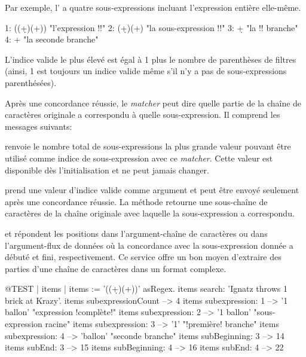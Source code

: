 \documentclass[a4paper,10pt,twoside]{book}
\begin{document}
{
Par exemple, l'\expreg \ct{((\d+)\s*(\w+))} a quatre sous-expressions
incluant l'expression entière elle-même.
\begin{code}{}
1:    ((\d+)\s*(\w+))    "l'expression !!"
2:    (\d+)\s*(\w+)       "la sous-expression !!"
3:    \d+                      "la !! branche"
4:    \w+                     "la seconde branche"
\end{code}

L'indice valide le plus élevé est égal à 1 plus le nombre de
parenthèses de filtres (ainsi, 1 est toujours un indice valide même
s'il n'y a pas de sous-expressions parenthésées).

Après une concordance réussie, le \emph{matcher} peut dire quelle
partie de la chaîne de caractères originale a correspondu à quelle
sous-expression. Il comprend les messages suivants:

 renvoie le nombre total de
sous-expressions \ie la plus grande valeur pouvant être utilisé comme
indice de sous-expression avec ce \emph{matcher}. Cette valeur est
disponible dès l'initialisation et ne peut jamais changer.

 prend une valeur d'indice valide
comme argument et peut être envoyé seulement après une concordance
réussie. La méthode retourne une sous-chaîne de caractères de la
chaîne originale avec laquelle la sous-expression a correspondu.

 et 
répondent les positions dans l'argument-chaîne de caractères ou dans
l'argument-flux de données où la concordance avec la sous-expression
donnée a débuté et fini, respectivement.
Ce service offre un bon moyen d'extraire des parties d'une chaîne de
caractères dans un format complexe.

\begin{code}{@TEST | items |}
items := '((\d+)\s*(\w+))' asRegex.
items search: 'Ignatz throws 1 brick at Krazy'.
items subexpressionCount --> 4
items subexpression: 1      --> '1 ballon'    "expression !complète!"
items subexpression: 2      --> '1 ballon'    "sous-expression racine"
items subexpression: 3      --> '1'             "!première! branche"
items subexpression: 4      --> 'ballon'       "seconde branche"
items subBeginning: 3       --> 14
items subEnd: 3                 --> 15
items subBeginning: 4       --> 16
items subEnd: 4                 --> 22
\end{code}

}
\end{document}
